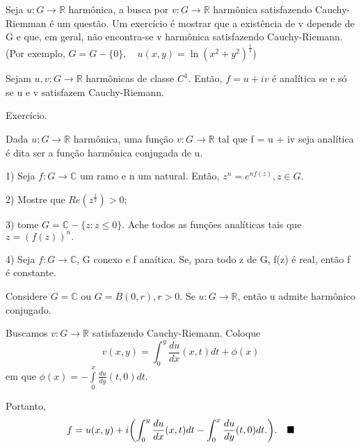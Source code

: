 \documentclass[complex.tex]{subfiles}
\begin{document}
Seja $u:G\rightarrow \mathbb{R}$ harm\^onica, a busca por $v:G\rightarrow \mathbb{R}$ harm\^onica
satisfazendo Cauchy-Riemman é um questão. Um exercício é mostrar que a existência de v
depende de G e que, em geral, não encontra-se v harm\^onica satisfazendo Cauchy-Riemann.
(Por exemplo, $G = G - \{0\}, \quad u(x, y) = \ln{(x ^{2} + y ^{2})}^{\frac{1}{2}}$)
\begin{theorem*}
	Sejam $u, v:G\rightarrow \mathbb{R}$ harm\^onicas de classe $C^1$. Então, $f = u + iv$
	é analítica se e só se u e v satisfazem Cauchy-Riemann.
\end{theorem*}
\begin{proof*}
	Exercício.
\end{proof*}
Dada $u:G\rightarrow \mathbb{R}$ harm\^onica, uma função $v:G\rightarrow \mathbb{R}$
tal que f = u + iv seja analítica é dita ser a função harm\^onica conjugada de u.
\begin{exer*}
	\item[1)] Seja $f:G\rightarrow \mathbb{C}$  um ramo e n um natural. Então, $z ^{n} = e ^{nf(z)}, z\in{G}.$
	\item[2)] Mostre que $Re(z ^{\frac{1}{2}}) > 0;$
	\item[3)] tome $G = \mathbb{C} - \{z: z\leq{0}\}.$ Ache todos as funções analíticas
	tais que $z = (f(z))^{n}.$
	\item[4)] Seja $f:G\rightarrow \mathbb{C}$, G conexo e f anaítica. Se, para todo
	z de G, f(z) é real, então f é constante.
\end{exer*}
\begin{theorem*}
	Considere $G = \mathbb{C} \text{ ou } G = B(0, r), r > 0.$ Se $u:G\rightarrow \mathbb{R}$,
	então u admite harm\^onico conjugado.
\end{theorem*}
\begin{proof*}
	Buscamos $v:G\rightarrow \mathbb{R}$ satisfazendo Cauchy-Riemann. Coloque
	$$
		v(x, y) = \int_{0}^{y}\frac{du}{dx}(x, t)dt + \phi(x)
	$$
	em que $\phi(x) = -\int\limits_{0}^{x}\frac{du}{dy}(t, 0)dt.$

	Portanto,
	$$
		f = u(x, y) + i\biggl(\int_{0}^{y}\frac{du}{dx}(x, t)dt - \int_{0}^{x}\frac{du}{dy}(t, 0)dt.\biggr).\quad\text{$\blacksquare$}
	$$
\end{proof*}
\end{document}
